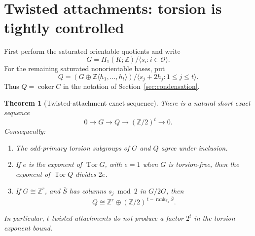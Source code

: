 \documentclass[11pt]{article}
\newtheorem{theorem}{Theorem}[section]
\theoremstyle{definition}
\theoremstyle{remark}
\newcommand{\Z}{\mathbb Z}
\newcommand{\F}{\mathbb F_2}
\newcommand{\coker}{\operatorname{coker}}
\newcommand{\Tor}{\operatorname{Tor}}
\newcommand{\rank}{\operatorname{rank}}
\newcommand{\satO}{\mathcal O}
\begin{document}
\section{Twisted attachments: torsion is tightly controlled}
\label{sec:twisting}

First perform the saturated orientable quotients and write
\begin{equation}
 G=H_1(K;\Z)/\langle s_i:i\in\satO\rangle.
 \label{eq:G}
\end{equation}
For the remaining saturated nonorientable bases, put
\[
 Q=(G\oplus\Z\langle h_1,\ldots,h_t\rangle)
       /\langle s_j+2h_j:1\leq j\leq t\rangle.
\]
Thus $Q=\coker C$ in the notation of Section~\ref{sec:condensation}.

\begin{theorem}[Twisted-attachment exact sequence]
\label{thm:twisting}
There is a natural short exact sequence
\begin{equation}
 0\longrightarrow G\longrightarrow Q\longrightarrow(\Z/2)^t
 \longrightarrow0.
 \label{eq:extension}
\end{equation}
Consequently:
\begin{enumerate}
\item The odd-primary torsion subgroups of $G$ and $Q$ agree under inclusion.
\item If $e$ is the exponent of $\Tor G$, with $e=1$ when $G$ is torsion-free,
then the exponent of $\Tor Q$ divides $2e$.
\item If $G\cong\Z^r$, and $\overline S$ has columns $s_j\bmod2$ in
$G/2G$, then
\begin{equation}
 Q\cong\Z^r\oplus(\Z/2)^{\,t-\rank_{\F}\overline S}.
 \label{eq:twist-rank}
\end{equation}
\end{enumerate}
In particular, $t$ twisted attachments do not produce a factor $2^t$ in the
\emph{torsion exponent} bound.
\end{theorem}
\end{document}
